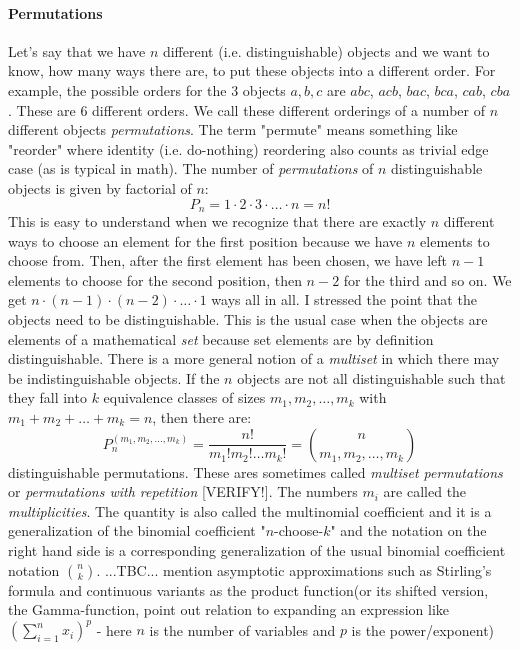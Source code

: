 \paragraph{Permutations}
Let's say that we have $n$ different (i.e. distinguishable) objects and we want to know, how many ways there are, to put these objects into a different order. For example, the possible orders for the $3$ objects $a,b,c$ are $abc$, $acb$, $bac$, $bca$, $cab$, $cba$. These are $6$ different orders. We call these different orderings of a number of $n$ different objects \emph{permutations}. The term "permute" means something like "reorder" where identity (i.e. do-nothing) reordering also counts as trivial edge case (as is typical in math). The number of \emph{permutations} of $n$ distinguishable objects is given by factorial of $n$:
\begin{equation}
P_n = 1 \cdot 2 \cdot 3 \cdot \ldots \cdot n = n!
\end{equation}
This is easy to understand when we recognize that there are exactly $n$ different ways to choose an element for the first position because we have $n$ elements to choose from. Then, after the first element has been chosen, we have left $n-1$ elements to choose for the second position, then $n-2$ for the third and so on. We get $n\cdot(n-1)\cdot(n-2)\cdot\ldots\cdot1$ ways all in all. I stressed the point that the objects need to be distinguishable. This is the usual case when the objects are elements of a mathematical \emph{set} because set elements are by definition distinguishable. There is a more general notion of a \emph{multiset} in which there may be indistinguishable objects. If the $n$ objects are not all distinguishable such that they fall into $k$ equivalence classes of sizes $m_1, m_2, \ldots, m_k$ with $m_1 + m_2 + \ldots + m_k = n$, then there are:
\begin{equation}
P_n^{(m_1,m_2,\ldots,m_k)} 
= \frac{n!}{m_1! m_2! \ldots m_k!} 
= \binom{n}{m_1,m_2,\ldots, m_k}
\end{equation}
distinguishable permutations. These ares sometimes called \emph{multiset permutations} or \emph{permutations with repetition} [VERIFY!]. The numbers $m_i$ are called the \emph{multiplicities}. The quantity is also called the multinomial coefficient and it is a generalization of the binomial coefficient "$n$-choose-$k$" and the notation on the right hand side is a corresponding generalization of the usual binomial coefficient notation $\binom{n}{k}$. ...TBC... mention asymptotic approximations such as Stirling's formula and continuous variants as the product function(or its shifted version, the Gamma-function, point out relation to expanding an expression like $(\sum_{i=1}^{n} x_i)^p$ - here $n$ is the number of variables and $p$ is the power/exponent)

